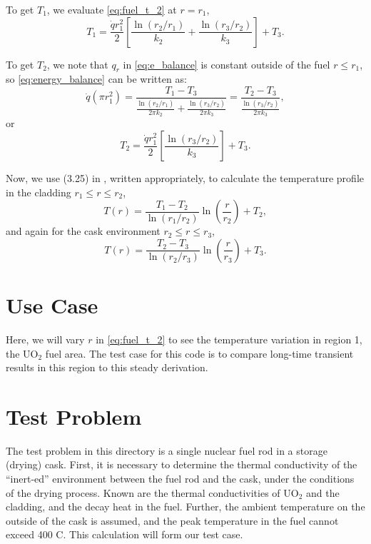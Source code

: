 \documentclass[12pt]{article}
\newcommand{\uo}{\mathrm{UO}_2}
\begin{document}
To get $T_1$, we evaluate \eqref{eq:fuel_t_2} at $r = r_1$,
%
\begin{equation}
T_1 = \frac{\dot{q} r_1^2}{2} \left[
\frac{\ln (r_2 / r_1)}{k_2} +
\frac{\ln (r_3 / r_2)}{k_3} \right] + T_3.
\label{eq:fuel_t_1a}
\end{equation}

To get $T_2$, we note that $q_r$ in \eqref{eq:e_balance} is constant outside of the fuel $r \leq r_1$, so
\eqref{eq:energy_balance} can be written as:
%
\begin{equation}
\dot{q} (\pi r_1^2) =
\frac{T_{1} - T_{3}}{\frac{\ln (r_2 / r_1)}{2\pi k_2} +
\frac{\ln (r_3 / r_2)}{2 \pi k_3} } =
\frac{T_{2} - T_{3}}{\frac{\ln (r_3 / r_2)}{2 \pi k_3} },
\end{equation}
%
or
%
\begin{equation}
T_2 = \frac{\dot{q} r_1^2}{2} \left[
\frac{\ln (r_3 / r_2)}{k_3} \right] + T_3.
\label{eq:fuel_t_2_a}
\end{equation}

Now, we use (3.25) in \cite{incropera81}, written appropriately, to calculate the
temperature profile in the cladding $r_1 \leq r \leq r_2$,
%
\begin{equation}
T(r) = \frac{T_1 - T_2}{\ln(r_1/r_2)} \ln(\frac{r}{r_2}) + T_2,
\label{eq:T_outer_a}
\end{equation}
%
and again for the cask environment $r_2 \leq r \leq r_3$,
%
\begin{equation}
T(r) = \frac{T_2 - T_3}{\ln(r_2/r_3)} \ln(\frac{r}{r_3}) + T_3.
\label{eq:T_outer_b}
\end{equation}

\section{Use Case}

Here, we will vary $r$ in \eqref{eq:fuel_t_2} to see the temperature variation in region 1, the $\uo$ fuel area. 
The test case for this code is to compare long-time transient results in this region to this steady derivation.

\section{Test Problem}

The test problem in this directory is a single nuclear fuel rod in a storage (drying) cask. First, it is necessary
to determine the thermal conductivity of the ``inert-ed'' environment between the fuel rod and the cask, under 
the conditions of the drying process. Known are the thermal conductivities of $\uo$ and the cladding, and
the decay heat in the fuel. Further, the ambient temperature on the outside of the cask is assumed, and the peak
temperature in the fuel cannot exceed 400 C. This calculation will form our test case. 
\end{document}
